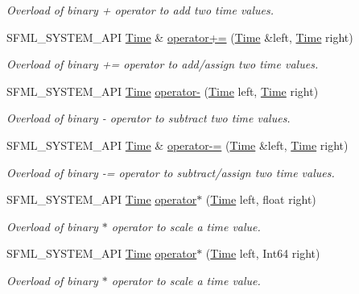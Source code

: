 \begin{DoxyCompactItemize}
\begin{DoxyCompactList}\small\item\em Overload of binary + operator to add two time values. \end{DoxyCompactList}\item 
S\-F\-M\-L\-\_\-\-S\-Y\-S\-T\-E\-M\-\_\-\-A\-P\-I \hyperlink{classsf_1_1Time}{Time} \& \hyperlink{classsf_1_1Time_a831c8df4b7b9b47eaa0c5a52a1be654c}{operator+=} (\hyperlink{classsf_1_1Time}{Time} \&left, \hyperlink{classsf_1_1Time}{Time} right)
\begin{DoxyCompactList}\small\item\em Overload of binary += operator to add/assign two time values. \end{DoxyCompactList}\item 
S\-F\-M\-L\-\_\-\-S\-Y\-S\-T\-E\-M\-\_\-\-A\-P\-I \hyperlink{classsf_1_1Time}{Time} \hyperlink{classsf_1_1Time_ace92ab9bc7aec80239af7218cd89cc80}{operator-\/} (\hyperlink{classsf_1_1Time}{Time} left, \hyperlink{classsf_1_1Time}{Time} right)
\begin{DoxyCompactList}\small\item\em Overload of binary -\/ operator to subtract two time values. \end{DoxyCompactList}\item 
S\-F\-M\-L\-\_\-\-S\-Y\-S\-T\-E\-M\-\_\-\-A\-P\-I \hyperlink{classsf_1_1Time}{Time} \& \hyperlink{classsf_1_1Time_aaf7888302cf4847f97cfc26875367b94}{operator-\/=} (\hyperlink{classsf_1_1Time}{Time} \&left, \hyperlink{classsf_1_1Time}{Time} right)
\begin{DoxyCompactList}\small\item\em Overload of binary -\/= operator to subtract/assign two time values. \end{DoxyCompactList}\item 
S\-F\-M\-L\-\_\-\-S\-Y\-S\-T\-E\-M\-\_\-\-A\-P\-I \hyperlink{classsf_1_1Time}{Time} \hyperlink{classsf_1_1Time_ac1386c6360872d354b9b59eadcd9778d}{operator$\ast$} (\hyperlink{classsf_1_1Time}{Time} left, float right)
\begin{DoxyCompactList}\small\item\em Overload of binary $\ast$ operator to scale a time value. \end{DoxyCompactList}\item 
S\-F\-M\-L\-\_\-\-S\-Y\-S\-T\-E\-M\-\_\-\-A\-P\-I \hyperlink{classsf_1_1Time}{Time} \hyperlink{classsf_1_1Time_acd021b3ebb108053d7dec56869e27385}{operator$\ast$} (\hyperlink{classsf_1_1Time}{Time} left, Int64 right)
\begin{DoxyCompactList}\small\item\em Overload of binary $\ast$ operator to scale a time value. \end{DoxyCompactList}\item 

\end{DoxyCompactItemize}
